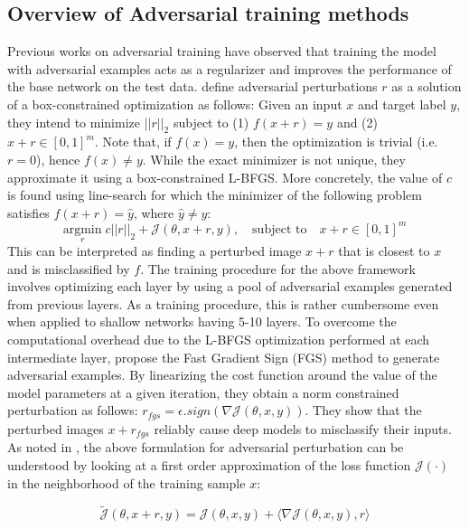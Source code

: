 \documentclass[letterpaper]{article} %
\begin{document}
\subsection{Overview of Adversarial training methods}
Previous works on adversarial training have observed that training the model with adversarial examples acts as a regularizer and improves the performance of the base network on the test data. \citeauthor{szegedy2013intriguing}  define adversarial perturbations $r$ as a solution of a box-constrained optimization as follows: Given an input $x$ and target label $y$, they intend to minimize $||r||_{2}$ subject to (1) $f(x+r)=y$ and (2) $x+r \in [0,1]^{m}$. Note that, if $f(x)=y$, then the optimization is trivial (i.e. $r=0$), hence $f(x)\neq y$.  While the exact minimizer is not unique, they approximate it using a box-constrained L-BFGS. More concretely, the value of $c$ is found using line-search for which the minimizer of the following problem satisfies $f(x+r)=\hat{y}$, where $\hat{y}\neq y$:
\begin{equation}
\underset{r}{\text{argmin}} \;  c||r||_{2} + \mathcal{J}(\theta,x+r,y), \quad \text{subject to} \quad x + r \in [0,1]^{m}
\label{eq:lbfgs}
\end{equation}
This can be interpreted as finding a perturbed image $x+r$ that is closest to $x$ and is misclassified by $f$. The training procedure for the above framework involves optimizing each layer by using a pool of adversarial examples generated from previous layers. As a training procedure, this is rather cumbersome even when applied to shallow networks having 5-10 layers. To overcome the computational overhead due to the L-BFGS optimization performed at each intermediate layer, \cite{goodfellow2014explaining} propose the Fast Gradient Sign (FGS) method to generate adversarial examples. By linearizing the cost function around the value of the model parameters at a given iteration, they obtain a norm constrained perturbation as follows: $r_{fgs}=\epsilon . sign(\nabla\mathcal{J}(\theta,x,y))$. They show that the perturbed images $x+r_{fgs}$ reliably cause deep models to misclassify their inputs. As noted in \cite{understandingAT}, the above formulation for adversarial perturbation can be understood by looking at a first order approximation of the loss function $\mathcal{J}(\cdot)$ in the neighborhood of the training sample $x$:

\begin{equation}
\tilde{\mathcal{J}}(\theta,x+r,y) = \mathcal{J}(\theta,x,y)+ \langle \nabla\mathcal{J}(\theta,x,y),r\rangle
\end{equation}
\end{document}
